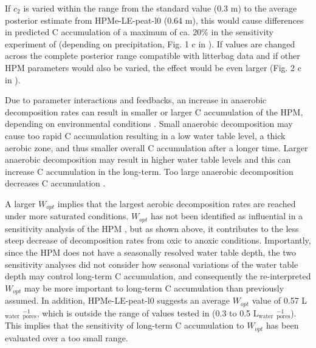 \documentclass[esd, manuscript]{copernicus}
\begin{document}
If \(c_2\) is varied within the range from the standard value (0.3 m) to the average posterior estimate from HPMe-LE-peat-l0 (0.64 m), this would cause differences in predicted C accumulation of a maximum of ca. 20\% in the sensitivity experiment of \citet{Quillet.2013} (depending on precipitation, Fig. 1 c in \citet{Quillet.2013}). If values are changed across the complete posterior range compatible with litterbag data and if other HPM parameters would also be varied, the effect would be even larger (Fig. 2 c in \citet{Quillet.2013}).

Due to parameter interactions and feedbacks, an increase in anaerobic decomposition rates can result in smaller or larger C accumulation of the HPM, depending on environmental conditions \citep{Quillet.2013}. Small anaerobic decomposition may cause too rapid C accumulation resulting in a low water table level, a thick aerobic zone, and thus smaller overall C accumulation after a longer time. Larger anaerobic decomposition may result in higher water table levels and this can increase C accumulation in the long-term. Too large anaerobic decomposition decreases C accumulation \citep{Quillet.2013}.

A larger \(W_{opt}\) implies that the largest aerobic decomposition rates are reached under more saturated conditions. \(W_{opt}\) has not been identified as influential in a sensitivity analysis of the HPM \citep{Quillet.2013}, but as shown above, it contributes to the less steep decrease of decomposition rates from oxic to anoxic conditions. Importantly, since the HPM does not have a seasonally resolved water table depth, the two sensitivity analyses did not consider how seasonal variations of the water table depth may control long-term C accumulation, and consequently the re-interpreted \(W_{opt}\) may be more important to long-term C accumulation than previously assumed. In addition, HPMe-LE-peat-l0 suggests an average \(W_{opt}\) value of 0.57 L\(_\text{water}\) \(_\text{pores}^{-1}\), which is outside the range of values tested in \citet{Quillet.2013} (0.3 to 0.5 L\(_\text{water}\) \(_\text{pores}^{-1}\)). This implies that the sensitivity of long-term C accumulation to \(W_{opt}\) has been evaluated over a too small range.
\end{document}
